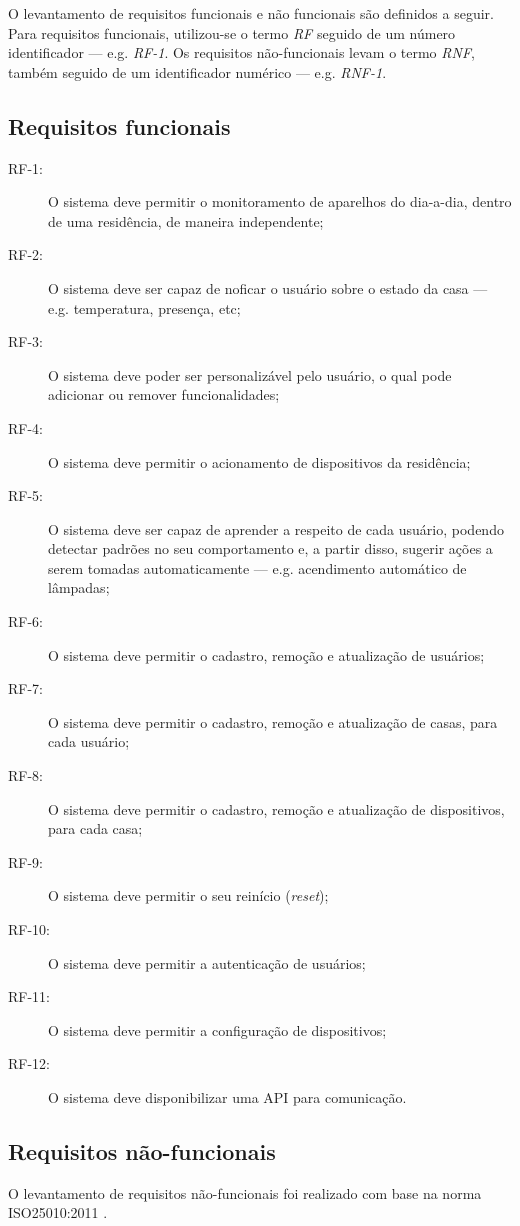 O levantamento de requisitos funcionais e não funcionais são definidos a seguir. Para requisitos funcionais, utilizou-se o termo \emph{RF} seguido de um número identificador --- e.g. \emph{RF-1}. Os requisitos não-funcionais levam o termo \emph{RNF}, também seguido de um identificador numérico --- e.g. \emph{RNF-1}.

\subsection{Requisitos funcionais}
\begin{description}
\item[RF-1:]O sistema deve permitir o monitoramento de aparelhos do dia-a-dia, dentro de uma residência, de maneira independente;
\item[RF-2:]O sistema deve ser capaz de noficar o usuário sobre o estado da casa --- e.g. temperatura, presença, etc;
\item[RF-3:]O sistema deve poder ser personalizável pelo usuário, o qual pode adicionar ou remover funcionalidades;
\item[RF-4:]O sistema deve permitir o acionamento de dispositivos da residência;
\item[RF-5:]O sistema deve ser capaz de aprender a respeito de cada usuário, podendo detectar padrões no seu comportamento e, a partir disso, sugerir ações a serem tomadas automaticamente --- e.g. acendimento automático de lâmpadas;
\item[RF-6:]O sistema deve permitir o cadastro, remoção e atualização de usuários;
\item[RF-7:]O sistema deve permitir o cadastro, remoção e atualização de casas, para cada usuário;
\item[RF-8:]O sistema deve permitir o cadastro, remoção e atualização de dispositivos, para cada casa;
\item[RF-9:]O sistema deve permitir o seu reinício (\emph{reset});
\item[RF-10:]O sistema deve permitir a autenticação de usuários;
\item[RF-11:]O sistema deve permitir a configuração de dispositivos;
\item[RF-12:]O sistema deve disponibilizar uma API para comunicação.

\end{description}

\subsection{Requisitos não-funcionais}
O levantamento de requisitos não-funcionais foi realizado com base na norma ISO25010:2011 \cite{iso25010}.

